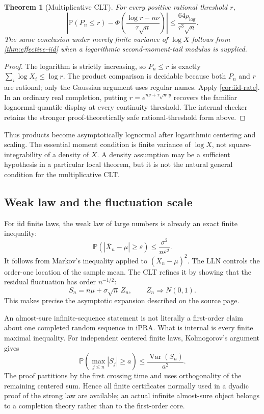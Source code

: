 \documentclass[11pt]{article}
\newtheorem{theorem}{Theorem}[section]
\newcommand{\Pp}{\mathbb P}
\newcommand{\Var}{\operatorname{Var}}
\newcommand{\PhiN}{\Phi}
\newcommand{\ipra}{\mathrm{iPRA}}
\begin{document}
\begin{theorem}[Multiplicative CLT]
For every positive rational threshold \(r\),
\[
 \left|
 \Pp(P_n\le r)-
 \PhiN\!\left(\frac{\log r-n\nu}{\tau\sqrt n}\right)
 \right|
 \le\frac{64\rho_{\log}}{\tau^3\sqrt n}.             \tag{16.3}
\]
The same conclusion under merely finite variance of \(\log X\) follows from
\cref{thm:effective-iid} when a logarithmic second-moment-tail modulus is
supplied.
\end{theorem}

\begin{proof}
The logarithm is strictly increasing, so \(P_n\le r\) is exactly
\(\sum_i\log X_i\le\log r\).  The product comparison is decidable because
both \(P_n\) and \(r\) are rational; only the Gaussian argument uses regular
names.  Apply \cref{cor:iid-rate}.  In an ordinary real completion, putting
\(r=e^{n\nu+\tau\sqrt n\,y}\) recovers the familiar lognormal-quantile
display at every continuity threshold.  The internal checker retains the
stronger proof-theoretically safe rational-threshold form above.
\end{proof}

Thus products become asymptotically lognormal after logarithmic centering and
scaling.  The essential moment condition is finite variance of \(\log X\),
not square-integrability of a density of \(X\).  A density assumption may be
a sufficient hypothesis in a particular local theorem, but it is not the
natural general condition for the multiplicative CLT.

\subsection{Weak law and the fluctuation scale}

For iid finite laws, the weak law of large numbers is already an exact finite
inequality:
\[
 \Pp(|\overline X_n-\mu|\ge\varepsilon)
 \le\frac{\sigma^2}{n\varepsilon^2}.                 \tag{16.4}
\]
It follows from Markov's inequality applied to
\((\overline X_n-\mu)^2\).  The LLN controls the order-one location of the
sample mean.  The CLT refines it by showing that the residual fluctuation has
order \(n^{-1/2}\):
\[
 S_n= n\mu+\sigma\sqrt n\,Z_n,
 \qquad Z_n\Longrightarrow N(0,1).                   \tag{16.5}
\]
This makes precise the asymptotic expansion described on the source page.

An almost-sure infinite-sequence statement is not literally a first-order
claim about one completed random sequence in \(\ipra\).  What is internal is
every finite maximal inequality.  For independent centered finite laws,
Kolmogorov's argument gives
\[
 \Pp\!\left(\max_{j\le n}|S_j|\ge a\right)
 \le\frac{\Var(S_n)}{a^2}.                            \tag{16.6}
\]
The proof partitions by the first crossing time and uses orthogonality of the
remaining centered sum.  Hence all finite certificates normally used in a
dyadic proof of the strong law are available; an actual infinite almost-sure
object belongs to a completion theory rather than to the first-order core.
\end{document}
